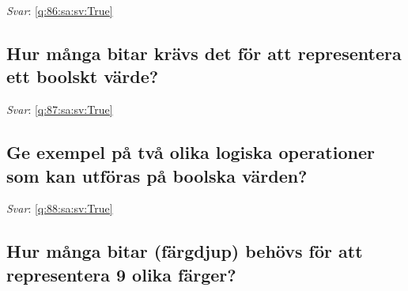 \documentclass[a4paper,11pt,oneside]{article}
\begin{document}
\begin{sloppypar}
\label{q:86:sa:sv:False}

\vspace{2cm}

\noindent\makebox[\textwidth]{\hrulefill}

\vspace{1cm}

\textit{Svar}: \autoref{q:86:sa:sv:True}



\subsection{Hur m\r{a}nga bitar kr\"avs det f\"or att representera ett boolskt v\"arde?}

\label{q:87:sa:sv:False}

\vspace{2cm}

\noindent\makebox[\textwidth]{\hrulefill}

\vspace{1cm}

\textit{Svar}: \autoref{q:87:sa:sv:True}



\subsection{Ge exempel p\r{a} tv\r{a} olika logiska operationer som kan utf\"oras p\r{a} boolska v\"arden?}

\label{q:88:sa:sv:False}

\vspace{2cm}

\noindent\makebox[\textwidth]{\hrulefill}

\vspace{1cm}

\textit{Svar}: \autoref{q:88:sa:sv:True}



\subsection{Hur m\r{a}nga bitar (f\"argdjup) beh\"ovs f\"or att representera 9 olika f\"arger?}

\label{q:89:sa:sv:False}

\vspace{2cm}

\noindent\makebox[\textwidth]{\hrulefill}

\vspace{1cm}


\end{sloppypar}
\end{document}
